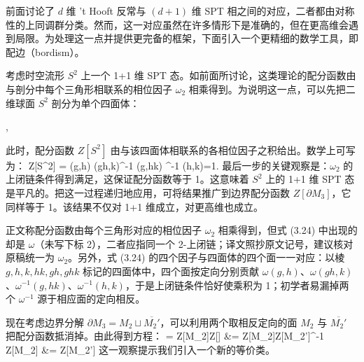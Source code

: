 前面讨论了 $d$ 维 't Hooft 反常与 $(d+1)$ 维 SPT 相之间的对应，二者都由对称性的上同调群分类。然而，这一对应虽然在许多情形下是准确的，但在更高维会遇到局限。为处理这一点并提供更完备的框架，下面引入一个更精细的数学工具，即配边（bordism）。

考虑时空流形 $S^2$ 上一个 1+1 维 SPT 态。如前面所讨论，这类理论的配分函数由与剖分中每个三角形相联系的相位因子 $\omega_2$ 相乘得到。为说明这一点，可以先把二维球面 $S^2$ 剖分为单个四面体：
\begin{center}
    ,
\end{center}
此时，配分函数 $Z[S^2]$ 由与该四面体相联系的各相位因子之积给出。数学上可写为：
\be Z[S^2] = \omega(g,h) \omega(gh,k)\omega^{-1} (g,hk) \omega^{-1} (h,k)=1. \ee
最后一步的关键观察是：$\omega_2$ 的上闭链条件得到满足，这保证配分函数等于 1。这意味着 $S^2$ 上的 1+1 维 SPT 态是平凡的。把这一过程递归地应用，可将结果推广到边界配分函数 $Z[\partial M_3]$，它同样等于 1。该结果不仅对 1+1 维成立，对更高维也成立。

\begin{yizhu}[原文疑误]正文称配分函数由每个三角形对应的相位因子 $\omega_2$ 相乘得到，但式 (3.24) 中出现的却是 $\omega$（未写下标 2），二者应指同一个 2-上闭链；译文照抄原文记号，建议核对原稿统一为 $\omega_2$。另外，式 (3.24) 的四个因子与四面体的四个面一一对应：以棱 $g,h,k,hk,gh,ghk$ 标记的四面体中，四个面按定向分别贡献 $\omega(g,h)$、$\omega(gh,k)$、$\omega^{-1}(g,hk)$、$\omega^{-1}(h,k)$，于是上闭链条件恰好使乘积为 1；初学者易漏掉两个 $\omega^{-1}$ 源于相应面的定向相反。\end{yizhu}

现在考虑边界分解 $\partial M_3 = M_2 \sqcup \overline{M_2'}$，可以利用两个取相反定向的面 $M_2$ 与 $\overline{M_2'}$ 把配分函数抵消掉。由此得到方程：
\be{} = Z[{M_2}]\cdot Z[]  &= Z[M_2]\cdot Z[M_2']^{-1}   \\  
\Rightarrow Z[M_2]  &=  Z[M_2'] \ea\ee
这一观察提示我们引入一个新的等价类。

